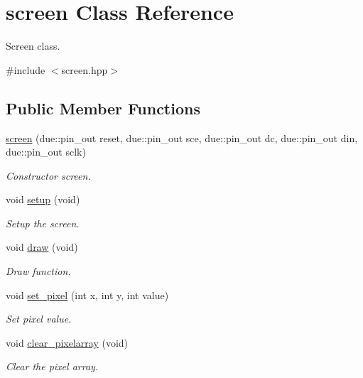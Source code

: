 \hypertarget{classscreen}{}\section{screen Class Reference}
\label{classscreen}


Screen class.  




{\ttfamily \#include $<$screen.\+hpp$>$}

\subsection*{Public Member Functions}
\begin{DoxyCompactItemize}
\item 
\hyperlink{classscreen_a874ae9e619cb981b05bcd0d42d3deebc}{screen} (due\+::pin\+\_\+out reset, due\+::pin\+\_\+out sce, due\+::pin\+\_\+out dc, due\+::pin\+\_\+out din, due\+::pin\+\_\+out sclk)
\begin{DoxyCompactList}\small\item\em Constructor screen. \end{DoxyCompactList}\item 
void \hyperlink{classscreen_aee06841cf6051765bcd65b44d427b1af}{setup} (void)
\begin{DoxyCompactList}\small\item\em Setup the screen. \end{DoxyCompactList}\item 
void \hyperlink{classscreen_ab9fcb7cf863eaaf9937c052366cb64b3}{draw} (void)
\begin{DoxyCompactList}\small\item\em Draw function. \end{DoxyCompactList}\item 
void \hyperlink{classscreen_a23a2fca2099a6bc8b627a3408a8d5621}{set\+\_\+pixel} (int x, int y, int value)
\begin{DoxyCompactList}\small\item\em Set pixel value. \end{DoxyCompactList}\item 
void \hyperlink{classscreen_a418d407e8925c94fdaf488ccfe375d34}{clear\+\_\+pixelarray} (void)
\begin{DoxyCompactList}\small\item\em Clear the pixel array. \end{DoxyCompactList}\end{DoxyCompactItemize}


